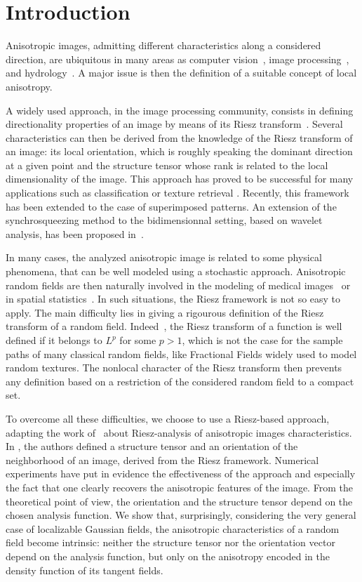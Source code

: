 \documentclass{elsarticle}
\begin{document}
\section{Introduction}
Anisotropic images, admitting different characteristics along a considered direction, are ubiquitous in many areas as computer vision~\cite{Pey07}, image processing~\cite{BE01}, and hydrology~\cite{Ben06}. A major issue is then the definition of a suitable concept of local anisotropy. 

A widely used approach, in the image processing community, consists in defining directionality properties of an image by means of its Riesz transform~\cite{FS01}. Several characteristics can then be derived from the knowledge of the Riesz transform of an image: its local orientation, which is roughly speaking the dominant direction at a given point and the structure tensor \cite{bigun1987optimal} whose rank is related to the local dimensionality of the image. This approach has proved to be successful for many applications such as classification or texture retrieval \cite{DFVM11}. Recently, this framework has been extended to the case of superimposed patterns. An extension of the synchrosqueezing method to the bidimensionnal setting, based on wavelet analysis, has been proposed in~\cite{COP15}. 

In many cases, the analyzed anisotropic image is related to some physical phenomena, that can be well modeled using a stochastic approach. Anisotropic random fields are then naturally involved in the modeling of medical images~\cite{BE01} or in spatial statistics~\cite{DH99}. In such situations, the Riesz framework is not so easy to apply. The main difficulty lies in giving a rigourous definition of the Riesz transform of a random field. Indeed~\cite{Stein70}, the Riesz transform of a function is well defined if it belongs to $L^p$ for some $p>1$, which is not the case for the sample paths of many classical random fields, like Fractional Fields widely used to model random textures. The nonlocal character of the Riesz transform then prevents any definition based on a restriction of the considered random field to a compact set. 

To overcome all these difficulties, we choose to use a Riesz-based approach, adapting the work of~\cite{bigun1987optimal,F02} about Riesz-analysis of anisotropic images characteristics. In \cite{F02}, the authors defined a structure tensor and an orientation of the neighborhood of an image, derived from the Riesz framework. Numerical experiments have put in evidence the effectiveness of the approach and especially the fact that one clearly recovers the anisotropic features of the image. From the theoretical point of view, the orientation and the structure tensor depend on the chosen analysis function. We show that, surprisingly, considering the very general case of localizable Gaussian fields, the anisotropic characteristics of a random field become intrinsic: neither the structure tensor nor the orientation vector depend on the analysis function, but only on the anisotropy encoded in the density function of its tangent fields. 
\end{document}
